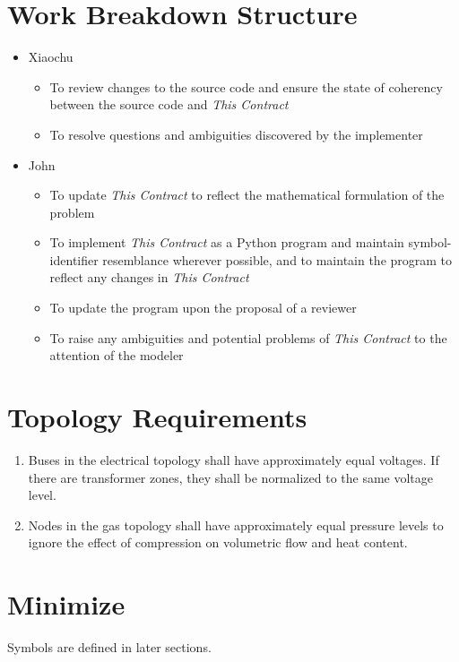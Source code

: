 \documentclass{article}
\newcommand{\this}{\emph{This Contract }}
\begin{document}
\section{Work Breakdown Structure}
\begin{itemize}
\item Xiaochu
  \begin{itemize}
  \item To review changes to the source code and ensure the state of coherency
    between the source code and \this
  \item To resolve questions and ambiguities discovered by the implementer
  \end{itemize}
\item John
  \begin{itemize}
  \item To update \this to reflect the mathematical formulation of the problem
  \item To implement \this as a Python program and maintain symbol-identifier
    resemblance wherever possible, and to maintain the program to reflect any
    changes in \this
  \item To update the program upon the proposal of a reviewer
  \item To raise any ambiguities and potential problems of \this to the
    attention of the modeler
  \end{itemize}
\end{itemize}



\section{Topology Requirements}
\begin{enumerate}
\item Buses in the electrical topology shall have approximately equal
  voltages. If there are transformer zones, they shall be normalized to the same
  voltage level.
\item Nodes in the gas topology shall have approximately equal pressure levels
  to ignore the effect of compression on volumetric flow and heat content.
\end{enumerate}



\section{Minimize}
Symbols are defined in later sections.
\end{document}
